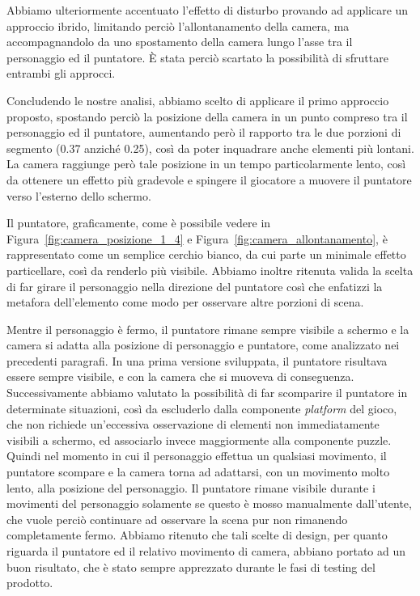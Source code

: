 Abbiamo ulteriormente accentuato l’effetto di disturbo provando ad applicare un approccio ibrido, limitando perciò l’allontanamento della camera, ma accompagnandolo da uno spostamento della camera lungo l’asse tra il personaggio ed il puntatore. È stata perciò scartato la possibilità di sfruttare entrambi gli approcci.

Concludendo le nostre analisi, abbiamo scelto di applicare il primo approccio proposto, spostando perciò la posizione della camera in un punto compreso tra il personaggio ed il puntatore, aumentando però il rapporto tra le due porzioni di segmento (0.37 anziché 0.25), così da poter inquadrare anche elementi più lontani. La camera raggiunge però tale posizione in un tempo particolarmente lento, così da ottenere un effetto più gradevole e spingere il giocatore a muovere il puntatore verso l’esterno dello schermo.

Il puntatore, graficamente, come è possibile vedere in Figura~\ref{fig:camera_posizione_1_4} e Figura~\ref{fig:camera_allontanamento}, è rappresentato come un semplice cerchio bianco, da cui parte un minimale effetto particellare, così da renderlo più visibile.
Abbiamo inoltre ritenuta valida la scelta di far girare il personaggio nella direzione del puntatore così che enfatizzi la metafora dell’elemento come modo per osservare altre porzioni di scena.

Mentre il personaggio è fermo, il puntatore rimane sempre visibile a schermo e la camera si adatta alla posizione di personaggio e puntatore, come analizzato nei precedenti paragrafi. In una prima versione sviluppata, il puntatore risultava essere sempre visibile, e con la camera che si muoveva di conseguenza. Successivamente abbiamo valutato la possibilità di far scomparire il puntatore in determinate situazioni, così da escluderlo dalla componente \textit{platform} del gioco, che non richiede un'eccessiva osservazione di elementi non immediatamente visibili a schermo, ed associarlo invece maggiormente alla componente puzzle.
Quindi nel momento in cui il personaggio effettua un qualsiasi movimento, il puntatore scompare e la camera torna ad adattarsi, con un movimento molto lento, alla posizione del personaggio.
Il puntatore rimane visibile durante i movimenti del personaggio solamente se questo è mosso manualmente dall’utente, che vuole perciò continuare ad osservare la scena pur non rimanendo completamente fermo.
Abbiamo ritenuto che tali scelte di design, per quanto riguarda il puntatore ed il relativo movimento di camera, abbiano portato ad un buon risultato, che è stato sempre apprezzato durante le fasi di testing del prodotto.

